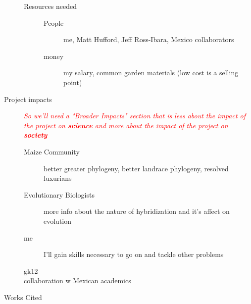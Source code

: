 \documentclass[11pt]{amsart}
\newcommand{\mbh}[1]{\textcolor{red}{ \emph{\scriptsize  #1}} }
\begin{document}
\begin{description}
\begin{description}
\begin{description}
\begin{description}
						\end{description}
				\end{description}
			\item[Resources needed]
				\begin{description}
					\item[People] me, Matt Hufford, Jeff Ross-Ibara, Mexico collaborators
					\item[money] my salary, common garden materials (low cost is a selling point)
				\end{description}
		\end{description}
	\item[Project impacts] \hfill
	\mbh{So we'll need a "Broader Impacts" section that is less about the impact of the project on \textbf{science} and more about the impact of the project on \textbf{society}}
		\begin{description}
			\item[Maize Community] better greater phylogeny, better landrace phylogeny, resolved luxurians
			\item[Evolutionary Biologists] more info about the nature of hybridization and it's affect on evolution
			\item[me] I'll gain skills necessary to go on and tackle other problems
			\item[gk12]
			\item[collaboration w Mexican academics]
		\end{description}
	\item[Works Cited] 
\end{description}
\end{document}
